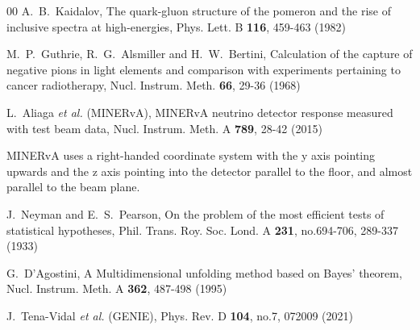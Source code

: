 \documentclass[aps,prl,twocolumn,superscriptaddress,nofootinbib]{revtex4-1}
\begin{document}
\begin{thebibliography}{00}
A.~B.~Kaidalov,
The quark-gluon structure of the pomeron and the rise of inclusive spectra at high-energies,
Phys. Lett. B \textbf{116}, 459-463 (1982)

M.~P.~Guthrie, R.~G.~Alsmiller and H.~W.~Bertini,
Calculation of the capture of negative pions in light elements and comparison with experiments pertaining to cancer radiotherapy,
Nucl. Instrum. Meth. \textbf{66}, 29-36 (1968)

L.~Aliaga \textit{et al.} (MINERvA),
MINERvA neutrino detector response measured with test beam data,
Nucl. Instrum. Meth. A \textbf{789}, 28-42 (2015)

MINERvA uses a right-handed coordinate system with the y axis pointing
upwards and the z axis pointing into the detector parallel to the floor,
and almost parallel to the beam  plane. 

J.~Neyman and E.~S.~Pearson,
On the problem of the most efficient tests of statistical hypotheses,
Phil. Trans. Roy. Soc. Lond. A \textbf{231}, no.694-706, 289-337 (1933)

G.~D'Agostini,
A Multidimensional unfolding method based on Bayes' theorem,
Nucl. Instrum. Meth. A \textbf{362}, 487-498 (1995)

J.~Tena-Vidal \textit{et al.} (GENIE),
Phys. Rev. D \textbf{104}, no.7, 072009 (2021)


\end{thebibliography}
\end{document}
